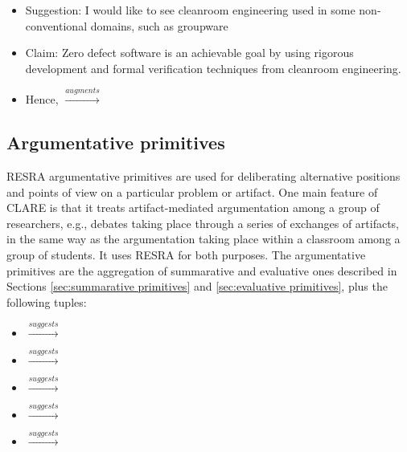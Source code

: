 \small
\begin{itemize}
\item {\sf Suggestion:} I would like to see cleanroom engineering used in
  some non-conventional domains, such as groupware
  
\item {\sf Claim:} Zero defect software is an achievable goal by using
  rigorous development and formal verification techniques from cleanroom
  engineering.

\item Hence,  \(
  \stackrel{augments}{\longrightarrow} \) 
\end{itemize}
\normalsize

\subsection{Argumentative primitives}
\label{sec:argumentative primitives}

RESRA argumentative primitives are used for deliberating alternative
positions and points of view on a particular problem or artifact. One main
feature of CLARE is that it treats artifact-mediated argumentation among a
group of researchers, e.g., debates taking place through a series of
exchanges of artifacts, in the same way as the argumentation taking place
within a classroom among a group of students. It uses RESRA for both
purposes. The argumentative primitives are the aggregation of summarative
and evaluative ones described in Sections \ref{sec:summarative primitives}
and \ref{sec:evaluative primitives}, plus the following tuples:

\begin{itemize}
   \item {} \( \stackrel{suggests}{\longrightarrow} \)
  
 \item {} \( \stackrel{suggests}{\longrightarrow} \)

 \item {} \( \stackrel{suggests}{\longrightarrow} \)

   \item {} \( \stackrel{suggests}{\longrightarrow} \)

\item {} \( \stackrel{suggests}{\longrightarrow} \)
\end{itemize}


